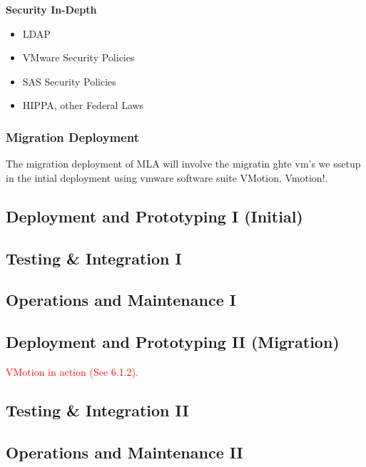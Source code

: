 \textbf{Security In-Depth}
\begin{itemize}
    \item LDAP
    \item VMware Security Policies
    \item SAS Security Policies
    \item HIPPA, other Federal Laws
\end{itemize}

\subsubsection{Migration Deployment}
The migration deployment of MLA will involve the migratin ghte vm's we ssetup in the intial deployment using vmware software suite VMotion. Vmotion!.

\subsection{Deployment and Prototyping I (Initial)}

\subsection{Testing \& Integration I}

\subsection{Operations and Maintenance I}

\subsection{Deployment and Prototyping II (Migration)}
\textcolor{red}{VMotion in action (See 6.1.2).}

\subsection{Testing \& Integration II}

\subsection{Operations and Maintenance II}

